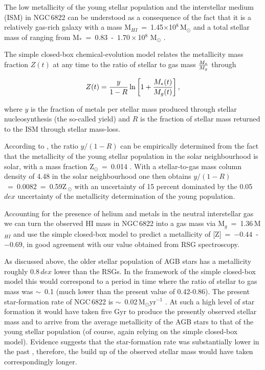 The low metallicity of the young stellar population and the interstellar medium (ISM) in NGC\,6822 can be understood as a consequence of the fact that it is a relatively gas-rich galaxy with a mass
M$_{HI}$~=~1.45$\times$10$^{8}$\,M$_{\odot}$
\citep{2004AJ....128...16K} and a total stellar mass of ranging from
M$_{*}$~=~$0.83$~-~$1.70\times$10$^{8}$ M$_{\odot}$
\citep{2008MNRAS.390.1453W,2013ApJ...779..102K,2014ApJ...789..147W}.

The simple closed-box chemical-evolution model relates the metallicity mass fraction $Z(t)$ at any time to the ratio of stellar to gas mass $M_{*}\over M_{g}$ through

\begin{equation}\label{closed-box}
Z(t) = {y \over 1-R } \ln \left[ 1 + {M_{*}(t)\over M_{g}(t)}  \right],
\end{equation}

\noindent where $y$ is the fraction of metals per stellar mass produced through stellar nucleosynthesis
(the so-called yield) and $R$ is the fraction of stellar mass returned to the ISM through stellar mass-loss.

According to
\citet{2015MNRAS.450..342K}, the ratio $y/(1-R)$ can be empirically determined from the fact that the metallicity of the young stellar population in the solar neighbourhood is solar, with a mass fraction Z$_{\odot}$~=~0.014
\citep{2012A&A...539A.143N}.
With a stellar-to-gas mass column density of 4.48 in the solar neighbourhood
\citep{2003ApJ...587..278W,2013ApJ...779..115B}
one then obtains $y/(1-R)$~=~0.0082~=~0.59Z\,$_{\odot}$ with an uncertainty of 15 percent dominated by the 0.05\,$dex$ uncertainty of the metallicity determination of the young population.

Accounting for the presence of helium and metals in the neutral interstellar gas we can turn the observed HI mass in NGC\,6822 into a gas mass via
M$_{g}$~=~1.36\,M$_{HI}$ and use the simple closed-box model to predict a metallicity of
[Z]~=~$-0.44$~-~$-0.69$,
in good agreement with our value obtained from RSG spectroscopy.

As discussed above, the older stellar population of AGB stars has a metallicity roughly 0.8\,$dex$ lower than the RSGs.
In the framework of the simple closed-box model this would correspond to a period in time where the ratio of stellar to gas mass was $\sim$~0.1
(much lower than the present value of 0.42-0.86).
The present star-formation rate of NGC\,6822 is $\sim$~0.02\,M$_{\odot}$yr$^{-1}$
\citep{2010A&A...512A..68G,2011ApJ...730...88E}.
At such a high level of star formation it would have taken five Gyr to produce the presently observed stellar mass and to arrive from the average metallicity of the AGB stars to that of the young stellar population
(of course, again relying on the simple closed-box model).
Evidence suggests that the star-formation rate was substantially lower in the past
\citep{2011ApJ...730...88E,2014ApJ...789..147W},
therefore, the build up of the observed stellar mass would have taken correspondingly longer.


